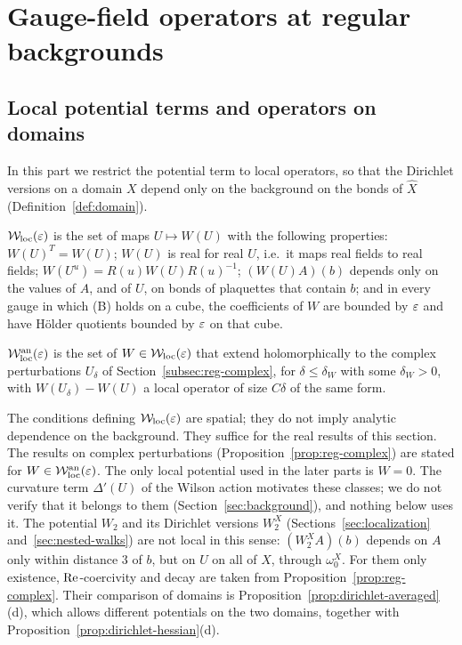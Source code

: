 \section{Gauge-field operators at regular backgrounds}\label{sec:reg-gauge}

\subsection{Local potential terms and operators on domains}

In this part we restrict the potential term to local operators, so that the Dirichlet versions on a domain $X$ depend only on the background on the bonds of $\hat X$ (Definition~\ref{def:domain}).

\begin{definition}
$\mathcal W_{\rm loc}(\varepsilon)$ is the set of maps $U\mapsto W(U)$ with the following properties: $W(U)^T=W(U)$; $W(U)$ is real for real $U$, i.e.\ it maps real fields to real fields; $W(U^u)=R(u)W(U)R(u)^{-1}$; $(W(U)A)(b)$ depends only on the values of $A$, and of $U$, on bonds of plaquettes that contain $b$; and in every gauge in which (B) holds on a cube, the coefficients of $W$ are bounded by $\varepsilon$ and have H\"older quotients bounded by $\varepsilon$ on that cube.

$\mathcal W^{\rm an}_{\rm loc}(\varepsilon)$ is the set of $W\in\mathcal W_{\rm loc}(\varepsilon)$ that extend holomorphically to the complex perturbations $U_\delta$ of Section~\ref{subsec:reg-complex}, for $\delta\le\delta_W$ with some $\delta_W>0$, with $W(U_\delta)-W(U)$ a local operator of size $C\delta$ of the same form.
\end{definition}

The conditions defining $\mathcal W_{\rm loc}(\varepsilon)$ are spatial; they do not imply analytic dependence on the background. They suffice for the real results of this section. The results on complex perturbations (Proposition~\ref{prop:reg-complex}) are stated for $W\in\mathcal W^{\rm an}_{\rm loc}(\varepsilon)$. The only local potential used in the later parts is $W=0$. The curvature term $\Delta'(U)$ of the Wilson action motivates these classes; we do not verify that it belongs to them (Section~\ref{sec:background}), and nothing below uses it. The potential $W_2$ and its Dirichlet versions $W_2^X$ (Sections~\ref{sec:localization} and~\ref{sec:nested-walks}) are not local in this sense: $(W_2^XA)(b)$ depends on $A$ only within distance $3$ of $b$, but on $U$ on all of $\hat X$, through $\omega_0^X$. For them only existence, $\operatorname{Re}$-coercivity and decay are taken from Proposition~\ref{prop:reg-complex}. Their comparison of domains is Proposition~\ref{prop:dirichlet-averaged}(d), which allows different potentials on the two domains, together with Proposition~\ref{prop:dirichlet-hessian}(d).

